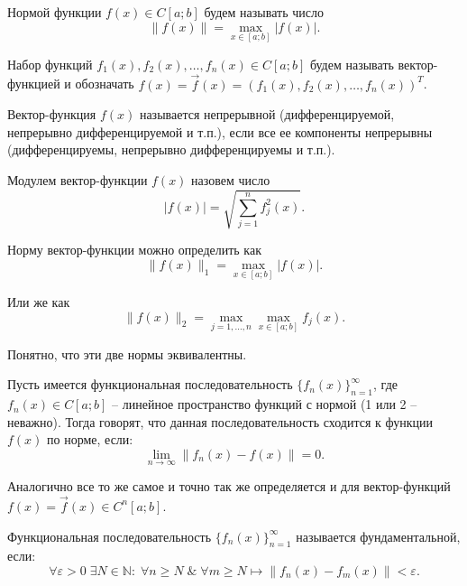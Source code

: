 \begin{definition}
    Нормой функции $f(x) \in C[a; b]$ будем называть число $$\|f(x)\| = \max_{x \in [a; b]}|f(x)|.$$
\end{definition}

\begin{definition}
    Набор функций $f_1(x), f_2(x), \dots, f_n(x) \in C[a; b]$ будем называть вектор-функцией и обозначать $f(x) = \overrightarrow{f}(x) = \left(f_1(x), f_2(x), \dots, f_n(x)\right)^T$.
\end{definition}

\begin{definition}
    Вектор-функция $f(x)$ называется непрерывной (дифференцируемой, непрерывно дифференцируемой и т.п.), если все ее компоненты непрерывны (дифференцируемы, непрерывно дифференцируемы и т.п.).
\end{definition}

\begin{definition}
    Модулем вектор-функции $f(x)$ назовем число
    \begin{equation}
        |f(x)| = \sqrt{\sum_{j = 1}^{n} f_j^2(x) }.
    \end{equation}
\end{definition}

Норму вектор-функции можно определить как $$\|f(x)\|_1 = \max_{x \in [a; b]}|f(x)|.$$

Или же как $$\|f(x)\|_2 = \max_{j = 1, \dots, n} \max_{x \in [a; b]} f_j(x).$$

Понятно, что эти две нормы эквивалентны.

\begin{definition}
    Пусть имеется функциональная последовательность $\{f_n(x)\}_{n = 1}^{\infty}$, где $f_n(x) \in C[a; b]$ -- линейное пространство функций с нормой (1 или 2 -- неважно). Тогда говорят, что данная последовательность сходится к функции $f(x)$ по норме, если:
    \begin{equation}
        \lim\limits_{n\rightarrow \infty} \|f_n(x) - f(x)\| = 0.
    \end{equation}

    Аналогично все то же самое и точно так же определяется и для вектор-функций $f(x) = \overrightarrow{f}(x) \in C^n[a; b]$.
\end{definition}

\begin{definition}
    Функциональная последовательность $\{f_n(x)\}_{n = 1}^{\infty}$ называется фундаментальной, если:
    \begin{equation}
        \forall \varepsilon > 0 \; \exists N \in \mathbb{N}: \; \forall n \geqslant N \; \& \; \forall m \geqslant N \longmapsto \|f_n(x) - f_m(x)\| < \varepsilon.
    \end{equation}
\end{definition}

